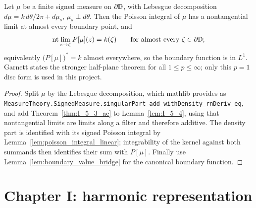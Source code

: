 \begin{theorem}[Garnett I.5.3: Fatou theorem, $p=1$ disc form]
  \label{thm:I_5_3}
  \leanok
  \mainline
  Let $\mu$ be a finite signed measure on $\partial\mathbb{D}$, with Lebesgue
  decomposition $d\mu=k\,d\theta/2\pi+d\mu_s$, $\mu_s\perp d\theta$. Then the
  Poisson integral of $\mu$ has a nontangential limit at almost every boundary
  point, and
  \[
    \operatorname{nt}\lim_{z\to\zeta}P[\mu](z)=k(\zeta)
    \qquad\text{for almost every }\zeta\in\partial\mathbb{D};
  \]
  equivalently $\bigl(P[\mu]\bigr)^*=k$ almost everywhere, so the boundary
  function is in $L^1$. Garnett states the stronger half-plane theorem for all
  $1\le p\le\infty$; only this $p=1$ disc form is used in this project.
  \begin{proof}
    \leanok
    Split $\mu$ by the Lebesgue decomposition, which mathlib provides as
    \texttt{MeasureTheory.SignedMeasure.singularPart\_add\_withDensity\_rnDeriv\_eq}, and add
    Theorem~\ref{thm:I_5_3_ac} to Lemma~\ref{lem:I_5_4}, using that
    nontangential limits are limits along a filter and therefore additive.
    The density part is identified with its signed Poisson integral by
    Lemma~\ref{lem:poisson_integral_linear}; integrability of the kernel
    against both summands then identifies their sum with $P[\mu]$. Finally use
    Lemma~\ref{lem:boundary_value_bridge} for the canonical boundary function.
  \end{proof}
\end{theorem}

\section{Chapter I: harmonic representation}

